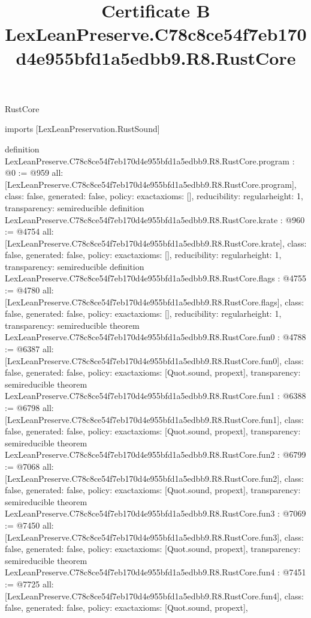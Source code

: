 \begin{lexlean}{RustCore}
\title{Certificate B LexLeanPreserve.C78c8ce54f7eb170d4e955bfd1a5edbb9.R8.RustCore}
\begin{coremodule}
imports [LexLeanPreservation.RustSound]

definition LexLeanPreserve.C78c8ce54f7eb170d4e955bfd1a5edbb9.R8.RustCore.program : @0 := @959 {
  all: [LexLeanPreserve.C78c8ce54f7eb170d4e955bfd1a5edbb9.R8.RustCore.program],
  class: false,
  generated: false,
  policy: exact{axioms: []},
  reducibility: regular{height: 1},
  transparency: semireducible
}
definition LexLeanPreserve.C78c8ce54f7eb170d4e955bfd1a5edbb9.R8.RustCore.krate : @960 := @4754 {
  all: [LexLeanPreserve.C78c8ce54f7eb170d4e955bfd1a5edbb9.R8.RustCore.krate],
  class: false,
  generated: false,
  policy: exact{axioms: []},
  reducibility: regular{height: 1},
  transparency: semireducible
}
definition LexLeanPreserve.C78c8ce54f7eb170d4e955bfd1a5edbb9.R8.RustCore.flags : @4755 := @4780 {
  all: [LexLeanPreserve.C78c8ce54f7eb170d4e955bfd1a5edbb9.R8.RustCore.flags],
  class: false,
  generated: false,
  policy: exact{axioms: []},
  reducibility: regular{height: 1},
  transparency: semireducible
}
theorem LexLeanPreserve.C78c8ce54f7eb170d4e955bfd1a5edbb9.R8.RustCore.fun0 : @4788 := @6387 {
  all: [LexLeanPreserve.C78c8ce54f7eb170d4e955bfd1a5edbb9.R8.RustCore.fun0],
  class: false,
  generated: false,
  policy: exact{axioms: [Quot.sound, propext]},
  transparency: semireducible
}
theorem LexLeanPreserve.C78c8ce54f7eb170d4e955bfd1a5edbb9.R8.RustCore.fun1 : @6388 := @6798 {
  all: [LexLeanPreserve.C78c8ce54f7eb170d4e955bfd1a5edbb9.R8.RustCore.fun1],
  class: false,
  generated: false,
  policy: exact{axioms: [Quot.sound, propext]},
  transparency: semireducible
}
theorem LexLeanPreserve.C78c8ce54f7eb170d4e955bfd1a5edbb9.R8.RustCore.fun2 : @6799 := @7068 {
  all: [LexLeanPreserve.C78c8ce54f7eb170d4e955bfd1a5edbb9.R8.RustCore.fun2],
  class: false,
  generated: false,
  policy: exact{axioms: [Quot.sound, propext]},
  transparency: semireducible
}
theorem LexLeanPreserve.C78c8ce54f7eb170d4e955bfd1a5edbb9.R8.RustCore.fun3 : @7069 := @7450 {
  all: [LexLeanPreserve.C78c8ce54f7eb170d4e955bfd1a5edbb9.R8.RustCore.fun3],
  class: false,
  generated: false,
  policy: exact{axioms: [Quot.sound, propext]},
  transparency: semireducible
}
theorem LexLeanPreserve.C78c8ce54f7eb170d4e955bfd1a5edbb9.R8.RustCore.fun4 : @7451 := @7725 {
  all: [LexLeanPreserve.C78c8ce54f7eb170d4e955bfd1a5edbb9.R8.RustCore.fun4],
  class: false,
  generated: false,
  policy: exact{axioms: [Quot.sound, propext]},
}
\end{coremodule}
\end{lexlean}
